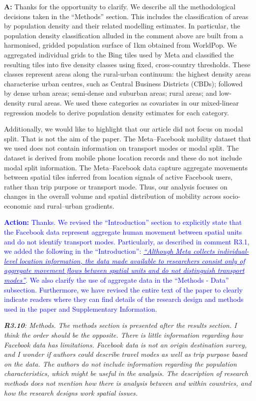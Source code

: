 \documentclass[12pt,a4paper,oneside, reqno]{amsart}
\begin{document}
\setlength{\leftskip}{1cm}\textbf{A:} Thanks for the opportunity to clarify. We describe all the methodological decisions taken in the ``Methods'' section. This includes the classification of areas by population density and their related modelling estimates. In particular, the population density classification alluded in the comment above are built from a harmonised, gridded population surface of 1km obtained from WorldPop. We aggregated individual grids to the Bing tiles used by Meta and classified the resulting tiles into five density classes using fixed, cross-country thresholds. These classes represent areas along the rural-urban continuum: the highest density areas characterise urban centres, such as Central Business Districts (CBDs); followed by dense urban areas; semi-dense and suburban areas; rural areas; and low-density rural areas. We used these categories as covariates in our mixed-linear regression models to derive population density estimates for each category.

Additionally, we would like to highlight that our article did not focus on modal split. That is not the aim of the paper. The Meta–Facebook mobility dataset that we used does not contain information on transport modes or modal split. The dataset is derived from mobile phone location records and these do not include modal split information. The Meta–Facebook data capture aggregate movements between spatial tiles inferred from location signals of active Facebook users, rather than trip purpose or transport mode. Thus, our analysis focuses on changes in the overall volume and spatial distribution of mobility across socio-economic and rural–urban gradients.


\textcolor{blue}{
\textbf{Action:} Thanks. We revised the ``Introduction'' section to explicitly state that the Facebook data represent aggregate human movement between spatial units and do not identify transport modes. Particularly, as described in comment R3.1, we added the following in the ``Introduction'': \textit{\uline{``Although Meta collects individual-level location information, the data made available to researchers consist only of aggregate movement flows between spatial units and do not distinguish transport modes''}}. We also clarify the use of aggregate data in the ``Methods - Data'' subsection. Furthermore, we have revised the entire text of the paper to clearly indicate readers where they can find details of the research design and methods used in the paper and Supplementary Information.
}

\setlength{\leftskip}{0cm} \textit{\textbf{R3.10}: Methods. The methods section is presented after the results section. I think the order should be the opposite. There is little information regarding how Facebook data has limitations. Facebook data is not an origin destination survey, and I wonder if authors could describe travel modes as well as trip purpose based on the data. The authors do not include information regarding the population characteristics, which might be useful in the analysis. The description of research methods does not mention how there is analysis between and within countries, and how the research designs work spatial issues.}
\end{document}
